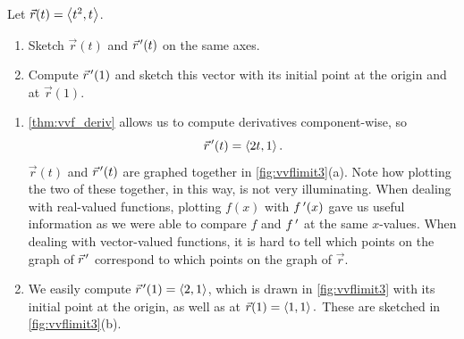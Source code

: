 \begin{example}\label{ex_vvflimit3}%
Let $\vec r(t) =\left\langle t^2,t\right\rangle$. 
\begin{enumerate}
	\item Sketch $\vec r(t)$ and $\vec r\hskip1.25pt '(t)$ on the same axes.
	\item	Compute $\vec r\hskip1.25pt '(1)$ and sketch this vector with its initial point at the origin and at $\vec r(1)$.
\end{enumerate}
\solution
\begin{enumerate}
\item	\autoref{thm:vvf_deriv} allows us to compute derivatives component-wise, so
\[\vec r\hskip1.25pt '(t) =\left\langle 2t, 1\right\rangle.\]
$\vec r(t)$ and $\vec r\hskip1.25pt '(t)$ are graphed together in \autoref{fig:vvflimit3}(a). Note how plotting the two of these together, in this way, is not very illuminating. When dealing with real-valued functions, plotting $f(x)$ with $f\,'(x)$ gave us useful information as we were able to compare $f$ and $f\,'$ at the same $x$-values. When dealing with vector-valued functions, it is hard to tell which points on the graph of $\vec r\hskip1.25pt '$ correspond to which points on the graph of $\vec r$.

\item	We easily compute $\vec r\hskip1.25pt '(1) =\left\langle 2,1\right\rangle$, which is drawn in \autoref{fig:vvflimit3} with its initial point at the origin, as well as at $\vec r(1) =\left\langle 1,1\right\rangle.$ These are sketched in \autoref{fig:vvflimit3}(b).
\end{enumerate}
\end{example}

\iftoggle{in_threeD}{%
\mtable{Viewing a vector-valued function and its derivative at one point.}{fig:vvflimit4}{%
\myincludeasythree{
3Droll=-0.5856992334166129,
3Dortho=0.004399999976158142,
3Dc2c=0.6354137063026428 0.6317671537399292 0.4439816176891327,
3Dcoo=-18.837804794311523 -8.740551948547363 60.22870635986328,
3Droo=150.0000027221829}{.7\marginparwidth}{Helix r (t) = ⟨cos t, sin t, t⟩ (blue) through origin; red arrow r′ (7pi/4) is tangent of length sqtr of 2 at that point.}{figures/figvvflimit4_3D}}%
}{%
\mtable{Viewing a vector-valued function and its derivative at one point, from two different perspectives.}{fig:vvflimit4}{%
\myincludegraphics[alt={Helix r (t) = ⟨cos t, sin t, t⟩ (blue) through origin; red arrow r′ (7pi/4) is tangent of length √2 at that point.},width=.7\marginparwidth]{figures/figvvflimit4_3D}
\\(a)\\
\myincludegraphics[alt={Space-curve r (t)=⟨t, 1–t², t²⟩ (blue) and red tangent line through point r(0)=⟨0,1,0⟩; axes ticked ±2.},width=.7\marginparwidth]{figures/figvvflimit4a_3D}
\\(b)}%
}%

